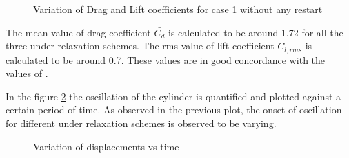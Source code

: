 \begin{figure}[H]
\centering
{}
\caption{Variation of Drag and Lift coefficients for case 1 without any restart}
\label{fig:4.5}
\end{figure}

The mean value of drag coefficient $\bar{C_d}$ is calculated to be around 1.72 for all the three under relaxation schemes. The rms value of lift coefficient $C_{l,rms}$ is calculated to be around 0.7. These values are in good concordance with the values of \citet{zhou1999vortex}.

In the figure \ref{fig:4.6} the oscillation of the cylinder is quantified and plotted against a certain period of time. As observed in the previous plot, the onset of oscillation for different under relaxation schemes is observed to be varying.

\begin{figure}[H]
\centering
{}
\caption{Variation of displacements vs time}
\label{fig:4.6}
\end{figure}
